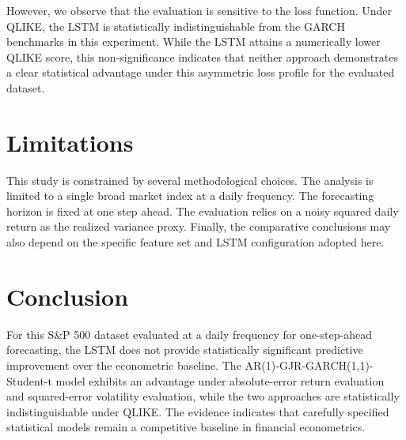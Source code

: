 \documentclass[11pt,a4paper]{article}
\begin{document}
However, we observe that the evaluation is sensitive to the loss function. Under QLIKE, the LSTM is statistically indistinguishable from the GARCH benchmarks in this experiment. While the LSTM attains a numerically lower QLIKE score, this non-significance indicates that neither approach demonstrates a clear statistical advantage under this asymmetric loss profile for the evaluated dataset.

\section{Limitations}
This study is constrained by several methodological choices. The analysis is limited to a single broad market index at a daily frequency. The forecasting horizon is fixed at one step ahead. The evaluation relies on a noisy squared daily return as the realized variance proxy. Finally, the comparative conclusions may also depend on the specific feature set and LSTM configuration adopted here.

\section{Conclusion}
For this S\&P 500 dataset evaluated at a daily frequency for one-step-ahead forecasting, the LSTM does not provide statistically significant predictive improvement over the econometric baseline. The AR(1)-GJR-GARCH(1,1)-Student-t model exhibits an advantage under absolute-error return evaluation and squared-error volatility evaluation, while the two approaches are statistically indistinguishable under QLIKE. The evidence indicates that carefully specified statistical models remain a competitive baseline in financial econometrics. 



\end{document}
